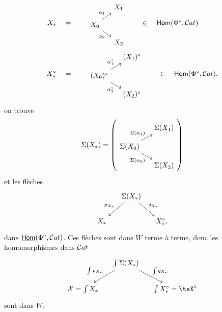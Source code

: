 \[
\begin{aligned}
X_* \quad &= \qquad
\begin{tikzcd}[ampersand replacement=\&, row sep=small, column sep=small]
 \& X_1 \\
X_0 \arrow[ur, "\alpha_1"] \arrow[dr, "\alpha_2"'] \& \\
 \& X_2
\end{tikzcd}
\qquad \in \quad \Hom(\Phi^\circ,\Cat)\\
X_*^\circ \quad &= \qquad
\begin{tikzcd}[ampersand replacement=\&, row sep=small, column sep=small]
 \& (X_1)^\circ \\
(X_0)^\circ \arrow[ur, "\alpha_1^\circ"] \arrow[dr, "\alpha_2^\circ"'] \& \\
 \& (X_2)^\circ
\end{tikzcd}
\qquad \in \quad \Hom(\Phi^\circ,\Cat),
\end{aligned}
\]
on trouve
\[
\Sigma(X_*) =
\left(
\begin{tikzcd}[row sep=small, column sep=small]
 & \Sigma(X_1) \\
\Sigma(X_0) \arrow[ur, "\Sigma(\alpha_1)"] \arrow[dr, "\Sigma(\alpha_2)"'] & \\
 & \Sigma(X_2)
\end{tikzcd}
\right)
\]
et les flèches
\[
\begin{tikzcd}[column sep=small]
 & \Sigma(X_*) \arrow[dl, "p_{X_*}"'] \arrow[dr, "q_{X_*}"] & \\
X_* & & X_*^\circ,
\end{tikzcd}
\]
dans $\underline{\mathsf{Hom}}(\Phi^\circ,\mathcal{C}at)$. Ces flèches sont dans $W$ terme à terme, donc les homomorphismes dans $\mathcal{C}at$
\[
\begin{tikzcd}[column sep=small]
 & \int\Sigma(X_*) \arrow[dl, "\int p_{X_*}"'] \arrow[dr, "\int q_{X_*}"] & \\
\sX=\int X_* & & \int X_*^\circ=\tsX^\circ
\end{tikzcd}
\]
sont dans $W$.

